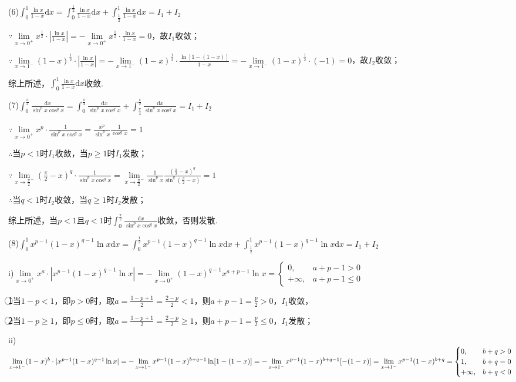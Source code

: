 \documentclass[12pt,UTF8]{ctexart}
\begin{document}
\begin{enumerate}
(6)$\int_0^1\frac{\ln x}{1-x}\mathrm dx=\int_0^{\frac12}\frac{\ln x}{1-x}\mathrm dx+\int_{\frac12}^1\frac{\ln x}{1-x}\mathrm dx=I_1+I_2$

$\because\lim\limits_{x\rightarrow0^+}x^{\frac12}\cdot|\frac{\ln x}{1-x}|=-\lim\limits_{x\rightarrow0^+}x^{\frac12}\cdot\frac{\ln x}{1-x}=0$，故$I_1$收敛；

$\because\lim\limits_{x\rightarrow1^-}(1-x)^{\frac12}\cdot|\frac{\ln x}{1-x}|=-\lim\limits_{x\rightarrow1^-}(1-x)^{\frac12}\cdot\frac{\ln[1-(1-x)]}{1-x}=-\lim\limits_{x\rightarrow1^-}(1-x)^{\frac12}\cdot(-1)=0$，故$I_2$收敛；

综上所述，$\int_0^1\frac{\ln x}{1-x}\mathrm dx$收敛.

(7)$\int_0^{\frac\pi2}\frac{\mathrm dx}{\sin^px\cos^qx}=\int_0^{\frac\pi4}\frac{\mathrm dx}{\sin^px\cos^qx}+\int_{\frac\pi4}^{\frac\pi2}\frac{\mathrm dx}{\sin^px\cos^qx}=I_1+I_2$

$\because\lim\limits_{x\rightarrow0^+}x^p\cdot\frac1{\sin^px\cos^qx}=\frac{x^p}{\sin^px}\frac1{\cos^qx}=1$

$\therefore$当$p<1$时$I_1$收敛，当$p\geq1$时$I_1$发散；

$\because\lim\limits_{x\rightarrow\frac\pi2^-}(\frac\pi2-x)^q\cdot\frac1{\sin^px\cos^qx}=\lim\limits_{x\rightarrow\frac\pi2^-}\frac1{\sin^px}\frac{(\frac\pi2-x)^q}{\sin^q(\frac\pi2-x)}=1$

$\therefore$当$q<1$时$I_2$收敛，当$q\geq1$时$I_2$发散；

综上所述，当$p<1$且$q<1$时$\int_0^{\frac\pi2}\frac{\mathrm dx}{\sin^px\cos^qx}$收敛，否则发散.

(8)$\int_0^1x^{p-1}(1-x)^{q-1}\ln x\mathrm dx=\int_0^{\frac12}x^{p-1}(1-x)^{q-1}\ln x\mathrm dx+\int_{\frac12}^1x^{p-1}(1-x)^{q-1}\ln x\mathrm dx=I_1+I_2$

i)$\lim\limits_{x\rightarrow0^+}x^a\cdot|x^{p-1}(1-x)^{q-1}\ln x|=-\lim\limits_{x\rightarrow0^+}(1-x)^{q-1}x^{a+p-1}\ln x=\begin{cases}
0,&a+p-1>0\\
+\infty,&a+p-1\leq0
\end{cases}$

\textcircled{1}当$1-p<1$，即$p>0$时，取$a=\frac{1-p+1}2=\frac{2-p}2<1$，则$a+p-1=\frac p2>0$，$I_1$收敛，

\textcircled{2}当$1-p\geq1$，即$p\leq0$时，取$a=\frac{1-p+1}2=\frac{2-p}2\geq1$，则$a+p-1=\frac p2\leq0$，$I_1$发散；

ii)$\lim\limits_{x\rightarrow1^-}(1-x)^b\cdot|x^{p-1}(1-x)^{q-1}\ln x|=-\lim\limits_{x\rightarrow1^-}x^{p-1}(1-x)^{b+q-1}\ln[1-(1-x)]\\
=-\lim\limits_{x\rightarrow1^-}x^{p-1}(1-x)^{b+q-1}[-(1-x)]=\lim\limits_{x\rightarrow1^-}x^{p-1}(1-x)^{b+q}=\begin{cases}
0,&b+q>0\\
1,&b+q=0\\
+\infty,&b+q<0
\end{cases}$


\end{enumerate}
\end{document}
